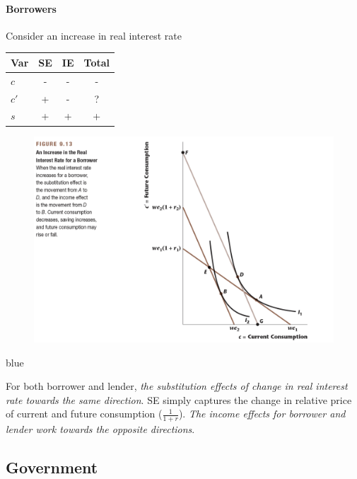 \documentclass[11pt]{article}
\begin{document}
		\newpage
		\paragraph{Borrowers} Consider an increase in real interest rate

		\begin{center}
			\begin{tabular}{l|ccc}
				Var & SE & IE & Total\\
				\hline
				$c$ & - & - & -\\
				$c'$ & + & - & ?\\
				$s$ & + & + & + \\
			\end{tabular}
		\end{center}
		
		\begin{figure}[h]
			\centering
			\includegraphics[width=\linewidth]{figures/913}
		\end{figure}
		
		\begin{color}{blue}
		\begin{remark}
			For both borrower and lender, \emph{the substitution effects of change in real interest rate towards the same direction}. SE simply captures the change in relative price of current and future consumption ($\frac{1}{1+r}$). \emph{The income effects for borrower and lender work towards the opposite directions}.
		\end{remark}
		\end{color}
		
		\subsection{Government}
		
\end{document}
